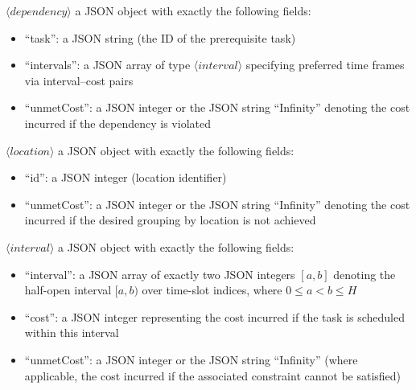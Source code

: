 $\langle\mathrm{\textit{dependency}}\rangle$ a JSON object with exactly the following fields:
\begin{itemize}
    \item ``task'': a JSON string (the ID of the prerequisite task)
    \item ``intervals'': a JSON array of type $\langle\mathrm{\textit{interval}}\rangle$ specifying preferred time frames via interval--cost pairs
    \item ``unmetCost'': a JSON integer or the JSON string ``Infinity'' denoting the cost incurred if the dependency is violated
\end{itemize}

$\langle\mathrm{\textit{location}}\rangle$ a JSON object with exactly the following fields:
\begin{itemize}
    \item ``id'': a JSON integer (location identifier)
    \item ``unmetCost'': a JSON integer or the JSON string ``Infinity'' denoting the cost incurred if the desired grouping by location is not achieved
\end{itemize}

$\langle\mathrm{\textit{interval}}\rangle$ a JSON object with exactly the following fields:
\begin{itemize}
    \item ``interval'': a JSON array of exactly two JSON integers $[a,b]$ denoting the half-open interval $[a,b)$ over time-slot indices, where $0 \leq a < b \leq H$
    \item ``cost'': a JSON integer representing the cost incurred if the task is scheduled within this interval
    \item ``unmetCost'': a JSON integer or the JSON string ``Infinity'' (where applicable, the cost incurred if the associated constraint cannot be satisfied)
\end{itemize}

